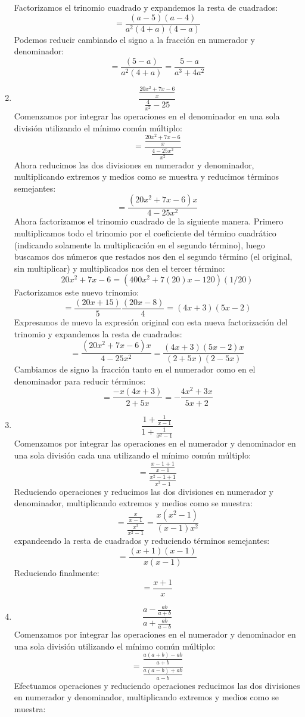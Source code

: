\documentclass[12pt]{article}
\begin{document}
\begin{enumerate}[label=\bfseries Ejercicio \arabic*:]
Factorizamos el trinomio cuadrado y expandemos la resta de cuadrados:
$$= \frac{(a - 5)(a - 4)}{a^2(4 + a)(4 - a)}$$
Podemos reducir cambiando el signo a la fracción en numerador y denominador:
$$= \frac{(5 - a)}{a^2(4 + a)} = \frac{5 - a}{a^3 + 4a^2}$$
  \item $$\frac{\frac{20x^2 + 7x - 6}{x}}{\frac{4}{x^2} - 25}$$
Comenzamos por integrar las operaciones en el denominador en una sola división utilizando el mínimo común múltiplo:
$$= \frac{\frac{20x^2 + 7x - 6}{x}}{\frac{4 - 25x^2}{x^2}}$$
Ahora reducimos las dos divisiones en numerador y denominador, multiplicando extremos y medios como se muestra y reducimos términos semejantes:
$$= \frac{(20x^2 + 7x - 6)x}{4 - 25x^2}$$
Ahora factorizamos el trinomio cuadrado de la siguiente manera. Primero multiplicamos todo el trinomio por el coeficiente del término cuadrático (indicando solamente la multiplicación en el segundo término), luego buscamos dos números que restados nos den el segundo término (el original, sin multiplicar) y multiplicados nos den el tercer término:
$$20x^2 + 7x - 6 = (400x^2 + 7(20)x -120)(1/20)$$
Factorizamos este nuevo trinomio:
$$= \frac{(20x + 15)}{5}\frac{(20x - 8)}{4} = (4x + 3)(5x -2)$$
Expresamos de nuevo la expresión original con esta nueva factorización del trinomio y expandemos la resta de cuadrados:
$$= \frac{(20x^2 + 7x - 6)x}{4 - 25x^2} = \frac{(4x + 3)(5x -2)x}{(2 + 5x)(2 - 5x)}$$
Cambiamos de signo la fracción tanto en el numerador como en el denominador para reducir términos:
$$= \frac{-x (4x + 3)}{2 + 5x} = - \frac{4x^2 + 3x}{5x + 2}$$
  \item $$\frac{1 + \frac{1}{x - 1}}{1 + \frac{1}{x^2 - 1}}$$
Comenzamos por integrar las operaciones en el numerador y denominador en una sola división cada una utilizando el mínimo común múltiplo:
$$= \frac{\frac{x - 1 + 1}{x - 1}}{\frac{x^2 - 1 + 1}{x^2 - 1}}$$
Reduciendo operaciones y reducimos las dos divisiones en numerador y denominador, multiplicando extremos y medios como se muestra:
$$= \frac{\frac{x}{x - 1}}{\frac{x^2}{x^2 - 1}} = \frac{x(x^2 - 1)}{(x - 1)x^2}$$
expandeendo la resta de cuadrados y reduciendo términos semejantes:
$$= \frac{(x + 1)(x - 1)}{x(x - 1)}$$
Reduciendo finalmente:
$$= \frac{x + 1}{x}$$
  \item $$\frac{a - \frac{ab}{a + b}}{a + \frac{ab}{a - b}}$$
Comenzamos por integrar las operaciones en el numerador y denominador en una sola división utilizando el mínimo común múltiplo:
$$= \frac{\frac{a(a+b) - ab}{a + b}}{\frac{a(a - b) + ab}{a - b}}$$
Efectuamos operaciones y reduciendo operaciones reducimos las dos divisiones en numerador y denominador, multiplicando extremos y medios como se muestra:

\end{enumerate}
\end{document}
